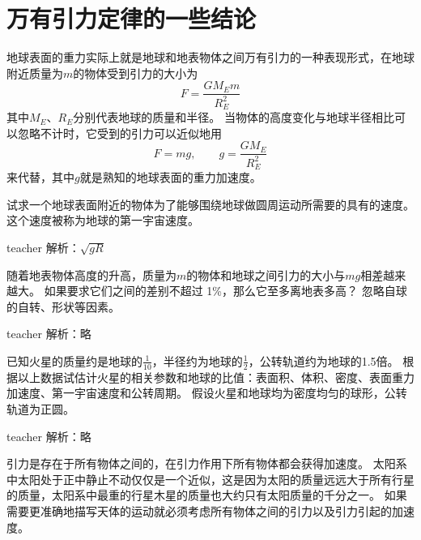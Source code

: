 \section{万有引力定律的一些结论}
地球表面的重力实际上就是地球和地表物体之间万有引力的一种表现形式，在地球附近质量为$m$的物体受到引力的大小为
\begin{equation}
F = \frac{GM_Em}{R_E^2}
\end{equation}
其中$M_E$、$R_E$分别代表地球的质量和半径。
当物体的高度变化与地球半径相比可以忽略不计时，它受到的引力可以近似地用
\begin{equation}
F = mg,\qquad g = \frac{GM_E}{R_E^2}
\end{equation}
来代替，其中$g$就是熟知的地球表面的重力加速度。


\begin{example}
试求一个地球表面附近的物体为了能够围绕地球做圆周运动所需要的具有的速度。这个速度被称为地球的第一宇宙速度。
\begin{taggedblock}{teacher}
\newline
解析：$\sqrt{gR}$
\end{taggedblock}
\end{example}


\begin{example}
随着地表物体高度的升高，质量为$m$的物体和地球之间引力的大小与$mg$相差越来越大。
如果要求它们之间的差别不超过 1\%，那么它至多离地表多高？
忽略自球的自转、形状等因素。
\begin{taggedblock}{teacher}
\newline
解析：略
\end{taggedblock}
\end{example}

\begin{example}
已知火星的质量约是地球的$\frac{1}{10}$，半径约为地球的$\frac{1}{2}$，公转轨道约为地球的1.5倍。
根据以上数据试估计火星的相关参数和地球的比值：表面积、体积、密度、表面重力加速度、第一宇宙速度和公转周期。
假设火星和地球均为密度均匀的球形，公转轨道为正圆。
\begin{taggedblock}{teacher}
\newline
解析：略
\end{taggedblock}
\end{example}

引力是存在于所有物体之间的，在引力作用下所有物体都会获得加速度。
太阳系中太阳处于正中静止不动仅仅是一个近似，这是因为太阳的质量远远大于所有行星的质量，太阳系中最重的行星木星的质量也大约只有太阳质量的千分之一。
如果需要更准确地描写天体的运动就必须考虑所有物体之间的引力以及引力引起的加速度。

